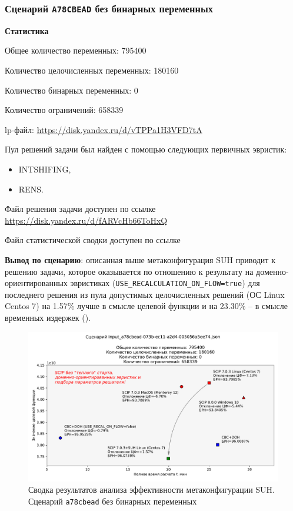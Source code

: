 \documentclass[%
	11pt,
	a4paper,
	utf8,
		]{article}
\begin{document}
\subsubsection{Сценарий \texttt{A78CBEAD} без бинарных переменных}

\textbf{Статистика}\vspace*{1mm}

Общее количество переменных: 795400

Количество целочисленных переменных: 180160

Количество бинарных переменных: 0

Количество ограничений: 658339

lp-файл: \url{https://disk.yandex.ru/d/vTPPa1H3VFD7tA}

Пул решений задачи был найден с помощью следующих первичных эвристик:
\begin{itemize}
	\item INTSHIFING,
	
	\item RENS.
\end{itemize}

Файл решения задачи доступен по ссылке \url{https://disk.yandex.ru/d/fARVcHb66ToHxQ}

Файл статистической сводки доступен по ссылке \url{}

\vspace*{3mm}
\textbf{Вывод по сценарию}: описанная выше метаконфигурация SUH приводит к решению задачи, которое оказывается по отношению к результату на доменно-ориентированных эвристиках (\verb|USE_RECALCULATION_ON_FLOW=true|) для последнего решения из пула допустимых целочисленных решений (ОС Linux Centos 7) на 1.57\% лучше в смысле целевой функции и на 23.30\% -- в смысле временных издержек ().

\begin{figure}[!h]
	\centering
	\includegraphics[scale=0.6]{figures/summary_a78cbead.pdf}
	\caption{Сводка результатов анализа эффективности метаконфигурации SUH. \\Сценарий \texttt{a78cbead} без бинарных переменных}\label{fig:summary_a78cbead}
\end{figure}
\end{document}

